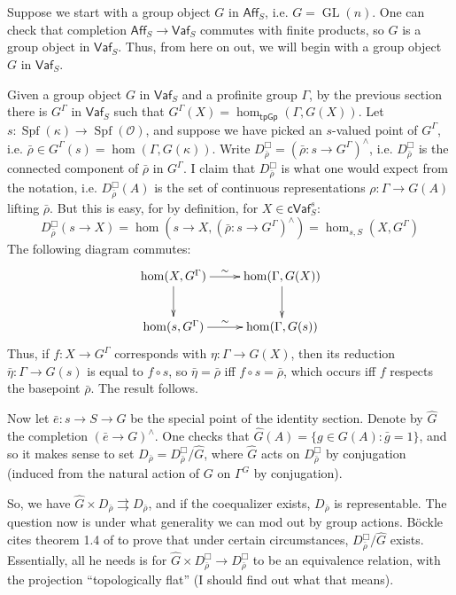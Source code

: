 \documentclass{article}
\DeclareMathOperator{\spf}{Spf}
\newcommand{\cO}{\mathcal{O}}
\numberwithin{theorem}{section}
\begin{document}
Suppose we start with a group object $G$ in $\mathsf{Aff}_S$, i.e. 
$G=\operatorname{GL}(n)$. One can check that completion 
$\mathsf{Aff}_S\to \mathsf{Vaf}_S$ commutes with finite products, so 
$\hat G$ is a group object in $\mathsf{Vaf}_S$. Thus, from here on out, 
we will begin with a group object $G$ in $\mathsf{Vaf}_S$. 

Given a group object $G$ in $\mathsf{Vaf}_S$ and a profinite group $\Gamma$, 
by the previous section there is $G^\Gamma$ in $\mathsf{Vaf}_S$ such that 
$G^\Gamma(X)=\hom_{\mathsf{tpGp}}(\Gamma,G(X))$. Let 
$s:\spf(\kappa)\to\spf(\cO)$, and suppose we have picked an $s$-valued point 
of $G^\Gamma$, i.e. $\bar\rho\in G^\Gamma(s)=\hom(\Gamma,G(\kappa))$. Write 
$D_{\bar\rho}^\Box = (\bar\rho:s\to G^\Gamma)^\wedge$, i.e. 
$D_{\bar\rho}^\Box$ is the connected component of $\bar\rho$ in $G^\Gamma$. I 
claim that $D_{\bar\rho}^\Box$ is what one would expect from the notation, 
i.e. $D_{\bar\rho}^\Box(A)$ is the set of continuous representations 
$\rho:\Gamma\to G(A)$ lifting $\bar\rho$. But this is easy, for by definition, 
for $X\in\mathsf{cVaf}_S^s$:
\[
  D_{\bar\rho}^\Box(s\to X)=\hom(s\to X,(\bar\rho:s\to G^\Gamma)^\wedge) = \hom_{s,S}(X,G^\Gamma)
\]
The following diagram commutes:
\[\xymatrix{
  \hom(X,G^\Gamma) \ar[r]^-\sim \ar[d]
    & \hom(\Gamma,G(X)) \ar[d] \\
  \hom(s,G^\Gamma) \ar[r]^-\sim  
    &\hom(\Gamma,G(s))
}\]
Thus, if $f:X\to G^\Gamma$ corresponds with $\eta:\Gamma\to G(X)$, then its 
reduction $\bar\eta:\Gamma\to G(s)$ is equal to $f\circ s$, so 
$\bar\eta=\bar\rho$ iff $f\circ s=\bar\rho$, which occurs iff $f$ respects the 
basepoint $\bar\rho$. The result follows. 

Now let $\bar e:s\to S\to G$ be the special point of the identity section. 
Denote by $\hat G$ the completion $(\bar e\to G)^\wedge$. One checks that 
$\hat G(A)=\{g\in G(A):\bar g=1\}$, and so it makes sense to set 
$D_{\bar\rho} = D_{\bar\rho}^\Box/\hat G$, where $\hat G$ acts on 
$D_{\bar\rho}^\Box$ by conjugation (induced from the natural action of $G$ on 
$\Gamma^G$ by conjugation). 

So, we have $\hat G\times D_{\bar\rho}\rightrightarrows D_{\bar\rho}$, and if 
the coequalizer exists, $D_{\bar\rho}$ is representable. The question now is 
under what generality we can mod out by group actions. B\"ockle cites 
theorem 1.4 of \cite[VII$_\text{B}$]{SGA3} to prove that under certain 
circumstances, $D_{\bar\rho}^\Box/\hat G$ exists. Essentially, all he needs 
is for $\hat G\times D_{\bar\rho}^\Box\to D_{\bar\rho}^\Box$ to be an 
equivalence relation, with the projection ``topologically flat'' (I should 
find out what that means). 
\end{document}

